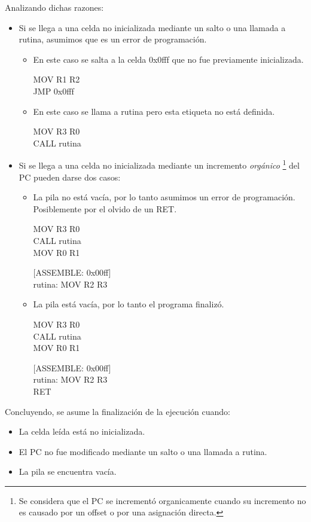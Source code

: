Analizando dichas razones: 
\begin{itemize}
  \item Si se llega a una celda no inicializada mediante un salto o una llamada a rutina, asumimos que es un error de programación.
  \begin{itemize}
    \item En este caso se salta a la celda 0x0fff que no fue previamente inicializada.
    \begin{center}
      MOV R1 R2 \\
      JMP 0x0fff
    \end{center}
    \item En este caso se llama a rutina pero esta etiqueta no está definida.
    \begin{center}
      MOV R3 R0 \\
      CALL rutina
    \end{center}
  \end{itemize}

  \item Si se llega a una celda no inicializada mediante un incremento \textit{orgánico} \footnote{Se considera que el PC se incrementó organicamente cuando su incremento no es causado por un offset o por una asignación directa.} del PC pueden darse dos casos:
  \begin{itemize}
    \item La pila no está vacía, por lo tanto asumimos un error de programación. Posiblemente por el olvido de un RET.
    \begin{center}
      MOV R3 R0 \\
      CALL rutina \\
      MOV R0 R1 \\
    \end{center}
    \begin{center}
      [ASSEMBLE: 0x00ff] \\
      rutina: MOV R2 R3
    \end{center}
    \item La pila está vacía, por lo tanto el programa finalizó.
    \begin{center}
      MOV R3 R0 \\
      CALL rutina \\
      MOV R0 R1 \\
    \end{center}
    \begin{center}
      [ASSEMBLE: 0x00ff] \\
      rutina: MOV R2 R3 \\
      RET
    \end{center}
  \end{itemize}
\end{itemize}
Concluyendo, se asume la finalización de la ejecución cuando:
\begin{itemize}
	\item La celda leída está no inicializada.
	\item El PC no fue modificado mediante un salto o una llamada a rutina.
	\item La pila se encuentra vacía.
\end{itemize}

